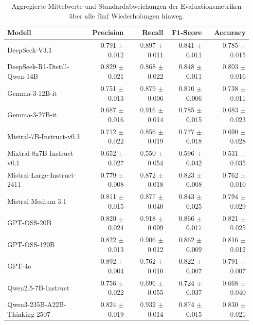 \begin{table}[htbp]
    \centering
    \caption{Aggregierte Mittelwerte und Standardabweichungen der Evaluationsmetriken über alle fünf Wiederholungen hinweg.}
    \label{tab:metrics-overview}
    \begin{adjustbox}{width=\textwidth}
        \begin{tabular}{l r r r r}
            \toprule
            Modell                          & Precision         & Recall            & F1-Score          & Accuracy \\
            \midrule
            DeepSeek-V3.1                   & 0.791 $\pm$ 0.012 & 0.897 $\pm$ 0.011 & 0.841 $\pm$ 0.011 & 0.785 $\pm$ 0.015 \\
            DeepSeek-R1-Distill-Qwen-14B    & 0.829 $\pm$ 0.021 & 0.868 $\pm$ 0.022 & 0.848 $\pm$ 0.011 & 0.803 $\pm$ 0.016 \\
            Gemma-3-12B-it                  & 0.751 $\pm$ 0.013 & 0.879 $\pm$ 0.006 & 0.810 $\pm$ 0.006 & 0.738 $\pm$ 0.011 \\
            Gemma-3-27B-it                  & 0.687 $\pm$ 0.016 & 0.916 $\pm$ 0.014 & 0.785 $\pm$ 0.015 & 0.683 $\pm$ 0.023 \\
            Mistral-7B-Instruct-v0.3        & 0.712 $\pm$ 0.022 & 0.856 $\pm$ 0.019 & 0.777 $\pm$ 0.018 & 0.690 $\pm$ 0.028 \\
            Mixtral-8x7B-Instruct-v0.1      & 0.652 $\pm$ 0.027 & 0.550 $\pm$ 0.054 & 0.596 $\pm$ 0.042 & 0.531 $\pm$ 0.035 \\
            Mistral-Large-Instruct-2411     & 0.779 $\pm$ 0.008 & 0.872 $\pm$ 0.018 & 0.823 $\pm$ 0.008 & 0.762 $\pm$ 0.010 \\
            Mistral Medium 3.1              & 0.811 $\pm$ 0.015 & 0.877 $\pm$ 0.040 & 0.843 $\pm$ 0.025 & 0.794 $\pm$ 0.029 \\
            GPT-OSS-20B                     & 0.820 $\pm$ 0.024 & 0.918 $\pm$ 0.009 & 0.866 $\pm$ 0.017 & 0.821 $\pm$ 0.025 \\
            GPT-OSS-120B                    & 0.822 $\pm$ 0.013 & 0.906 $\pm$ 0.012 & 0.862 $\pm$ 0.009 & 0.816 $\pm$ 0.012 \\
            GPT-4o                          & 0.892 $\pm$ 0.004 & 0.762 $\pm$ 0.010 & 0.822 $\pm$ 0.007 & 0.791 $\pm$ 0.007 \\
            Qwen2.5-7B-Instruct             & 0.756 $\pm$ 0.022 & 0.696 $\pm$ 0.055 & 0.724 $\pm$ 0.037 & 0.668 $\pm$ 0.040 \\
            Qwen3-235B-A22B-Thinking-2507   & 0.824 $\pm$ 0.019 & 0.932 $\pm$ 0.014 & 0.874 $\pm$ 0.015 & 0.830 $\pm$ 0.021 \\
            \bottomrule
        \end{tabular}
    \end{adjustbox}
\end{table}